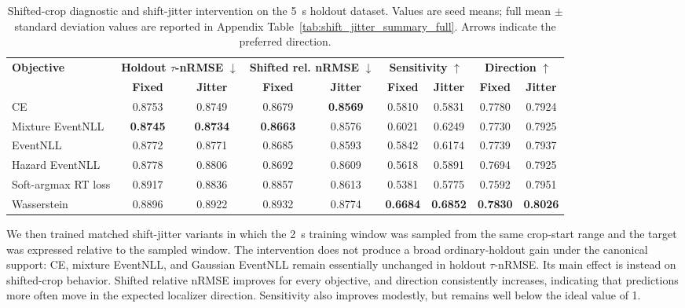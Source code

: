 \documentclass[12pt]{article}
\begin{document}
\begin{table}[!t]
\centering
\caption{Shifted-crop diagnostic and shift-jitter intervention on the 5~s holdout dataset. Values are seed means; full mean $\pm$ standard deviation values are reported in Appendix Table~\ref{tab:shift_jitter_summary_full}. Arrows indicate the preferred direction.}
\label{tab:shift_jitter_summary}
\footnotesize
\setlength{\tabcolsep}{3.5pt}
\renewcommand{\arraystretch}{1.12}
\begin{tabular}{@{} l c c c c c c c c @{}}
\toprule
\textbf{Objective} & \multicolumn{2}{c}{\textbf{Holdout \(\tau\)-nRMSE} $\downarrow$} & \multicolumn{2}{c}{\textbf{Shifted rel. nRMSE} $\downarrow$} & \multicolumn{2}{c}{\textbf{Sensitivity} $\uparrow$} & \multicolumn{2}{c}{\textbf{Direction} $\uparrow$} \\
\cmidrule(lr){2-3}\cmidrule(lr){4-5}\cmidrule(lr){6-7}\cmidrule(l){8-9}
 & \textbf{Fixed} & \textbf{Jitter} & \textbf{Fixed} & \textbf{Jitter} & \textbf{Fixed} & \textbf{Jitter} & \textbf{Fixed} & \textbf{Jitter} \\
\midrule
CE & 0.8753 & 0.8749 & 0.8679 & \textbf{0.8569} & 0.5810 & 0.5831 & 0.7780 & 0.7924 \\
Mixture EventNLL & \textbf{0.8745} & \textbf{0.8734} & \textbf{0.8663} & 0.8576 & 0.6021 & 0.6249 & 0.7730 & 0.7925 \\
EventNLL & 0.8772 & 0.8771 & 0.8685 & 0.8593 & 0.5842 & 0.6174 & 0.7739 & 0.7937 \\
Hazard EventNLL & 0.8778 & 0.8806 & 0.8692 & 0.8609 & 0.5618 & 0.5891 & 0.7694 & 0.7925 \\
Soft-argmax RT loss & 0.8917 & 0.8836 & 0.8857 & 0.8613 & 0.5381 & 0.5775 & 0.7592 & 0.7951 \\
Wasserstein & 0.8896 & 0.8922 & 0.8932 & 0.8774 & \textbf{0.6684} & \textbf{0.6852} & \textbf{0.7830} & \textbf{0.8026} \\
\bottomrule
\end{tabular}
\end{table}

We then trained matched shift-jitter variants in which the 2~s training window was sampled from the same crop-start range and the target was expressed relative to the sampled window. The intervention does not produce a broad ordinary-holdout gain under the canonical support: CE, mixture EventNLL, and Gaussian EventNLL remain essentially unchanged in holdout \(\tau\)-nRMSE. Its main effect is instead on shifted-crop behavior. Shifted relative nRMSE improves for every objective, and direction consistently increases, indicating that predictions more often move in the expected localizer direction. Sensitivity also improves modestly, but remains well below the ideal value of 1.
\end{document}

